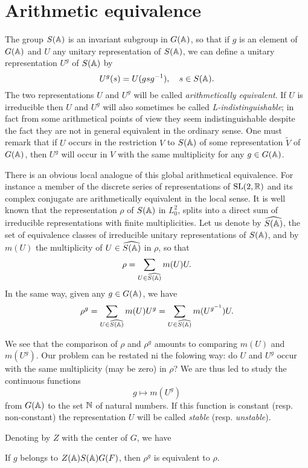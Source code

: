 \section{Arithmetic equivalence}
\label{sec:arithmetic}

The group $S(\mathbb{A})$ is an invariant subgroup in $G(\mathbb{A})$, so that if $g$ is an element of $G(\mathbb{A})$ and $U$ any unitary representation of $S(\mathbb{A})$, we can define a unitary representation $U^g$ of $S(\mathbb{A})$ by
\[
    U^g(s) = U(g s g^{-1}), \quad s \in S(\mathbb{A}).
\]
The two representations $U$ and $U^g$ will be called \emph{arithmetically equivalent}. 
If $U$ is irreducible then $U$ and $U^g$ will also sometimes be called \emph{L-indistinguishable};
in fact from some arithmetical points of view they seem indistinguishable despite the fact they are not in general equivalent in the ordinary sense.
One must remark that if $U$ occurs in the restriction $V$ to $S(\mathbb{A})$ of some representation $\widetilde{V}$ of $G(\mathbb{A})$, then $U^g$ will occur in $V$ with the same multiplicity for any $g \in G(\mathbb{A})$.

There is an obvious local analogue of this global arithmetical equivalence.
For instance a member of the discrete series of representations of $\mathrm{SL}(2, \mathbb{R})$ and its complex conjugate are arithmetically equivalent in the local sense.
It is well known that the representation $\rho$ of $S(\mathbb{A})$ in $L_0^2$, splits into a direct sum of irreducible representations with finite multiplicities.
Let us denote by $\widehat{S(\mathbb{A})}$, the set of equivalence classes of irreducible unitary representations of $S(\mathbb{A})$, and by $m(U)$ the multiplicity of $U \in \widehat{S(\mathbb{A})}$ in $\rho$, so that
\[
    \rho = \sum_{U \in \widehat{S(\mathbb{A})}} m(U) U.
\]
In the same way, given any $g \in G(\mathbb{A})$, we have
\[
    \rho^g = \sum_{U \in \widehat{S(\mathbb{A})}} m(U) U^g = \sum_{U \in \widehat{S(\mathbb{A})}} m(U^{g^{-1}}) U.
\]

We see that the comparison of $\rho$ and $\rho^g$ amounts to comparing $m(U)$ and $m(U^g)$.
Our problem can be restated ni the folowing way: do $U$ and $U^g$ occur with the same multiplicity (may be zero) in $\rho$?
We are thus led to study the continuous functions
\[
    g \mapsto m(U^g)
\]
from $G(\mathbb{A})$ to the set $\mathbb{N}$ of natural numbers.
If this function is constant (resp. non-constant) the representation $U$ will be called \emph{stable} (resp. \emph{unstable}).

Denoting by $Z$ with the center of $G$, we have

\begin{lemma}
If $g$ belongs to $Z(\mathbb{A})S(\mathbb{A})G(F)$, then $\rho^g$ is equivalent to $\rho$.
\end{lemma}

